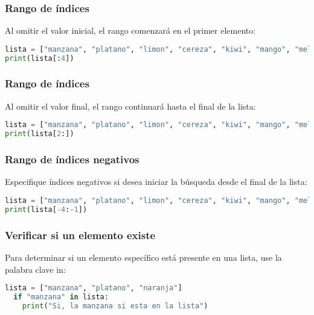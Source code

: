 \begin{frame}[fragile]
  \frametitle{Rango de índices}

  Al omitir el valor inicial, el rango comenzará en el primer elemento: 
  \vspace{\baselineskip}
  \begin{lstlisting}[language=Python]
lista = ["manzana", "platano", "limon", "cereza", "kiwi", "mango", "melon"]
print(lista[:4]) 
  \end{lstlisting}
\end{frame}

\begin{frame}[fragile]
  \frametitle{Rango de índices}

  Al omitir el valor final, el rango continuará hasta el final de la lista: 
  \vspace{\baselineskip}
  \begin{lstlisting}[language=Python]
lista = ["manzana", "platano", "limon", "cereza", "kiwi", "mango", "melon"]
print(lista[2:]) 
  \end{lstlisting}
\end{frame}

\begin{frame}[fragile]
  \frametitle{Rango de índices negativos}

  Especifique índices negativos si desea iniciar la búsqueda
  desde el final de la lista:

  \vspace{\baselineskip}
  \begin{lstlisting}[language=Python]
lista = ["manzana", "platano", "limon", "cereza", "kiwi", "mango", "melon"]
print(lista[-4:-1]) 
  \end{lstlisting}
\end{frame}

\begin{frame}[fragile]
  \frametitle{Verificar si un elemento existe}

  Para determinar si un elemento específico está presente en una lista,
  use la palabra clave
  \textcolor{codeKeyword}{in}:

  \vspace{\baselineskip}
  \begin{lstlisting}[language=Python]
  lista = ["manzana", "platano", "naranja"]
  if "manzana" in lista:
    print("Si, la manzana si esta en la lista")
  \end{lstlisting}
\end{frame}


